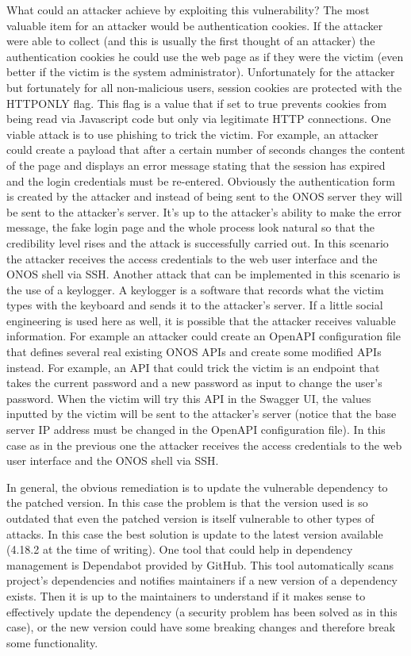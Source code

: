 \documentclass[a4paper,10pt]{memoir}
\begin{document}
What could an attacker achieve by exploiting this vulnerability? The most valuable item for an attacker would be authentication cookies. If the attacker were able to collect (and this is usually the first thought of an attacker) the authentication cookies he could use the web page as if they were the victim (even better if the victim is the system administrator). Unfortunately for the attacker but fortunately for all non-malicious users, session cookies are protected with the HTTPONLY flag. This flag is a value that if set to true prevents cookies from being read via Javascript code but only via legitimate HTTP connections. One viable attack is to use phishing to trick the victim. For example, an attacker could create a payload that after a certain number of seconds changes the content of the page and displays an error message stating that the session has expired and the login credentials must be re-entered. Obviously the authentication form is created by the attacker and instead of being sent to the ONOS server they will be sent to the attacker's server. It's up to the attacker's ability to make the error message, the fake login page and the whole process look natural so that the credibility level rises and the attack is successfully carried out. In this scenario the attacker receives the access credentials to the web user interface and the ONOS shell via SSH. Another attack that can be implemented in this scenario is the use of a keylogger. A keylogger is a software that records what the victim types with the keyboard and sends it to the attacker's server. If a little social engineering is used here as well, it is possible that the attacker receives valuable information. For example an attacker could create an OpenAPI configuration file that defines several real existing ONOS APIs and create some modified APIs instead. For example, an API that could trick the victim is an endpoint that takes the current password and a new password as input to change the user's password. When the victim will try this API in the Swagger UI, the values inputted by the victim will be sent to the attacker's server (notice that the base server IP address must be changed in the OpenAPI configuration file). In this case as in the previous one the attacker receives the access credentials to the web user interface and the ONOS shell via SSH.
\medskip

In general, the obvious remediation is to update the vulnerable dependency to the patched version. In this case the problem is that the version used is so outdated that even the patched version is itself vulnerable to other types of attacks. In this case the best solution is update to the latest version available (4.18.2 at the time of writing). One tool that could help in dependency management is Dependabot provided by GitHub. This tool automatically scans project's dependencies and notifies maintainers if a new version of a dependency exists. Then it is up to the maintainers to understand if it makes sense to effectively update the dependency (a security problem has been solved as in this case), or the new version could have some breaking changes and therefore break some functionality.
\end{document}
